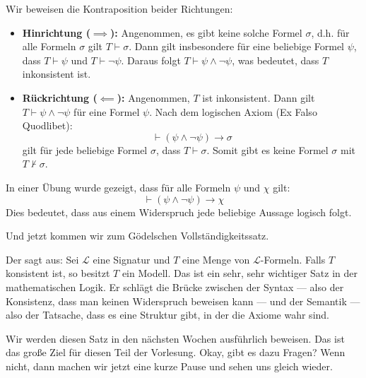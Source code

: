 \begin{math-stroke}

\begin{short-proof}
Wir beweisen die Kontraposition beider Richtungen:
\begin{itemize}
    \item \textbf{Hinrichtung ($\implies$):} Angenommen, es gibt keine solche Formel $\sigma$, d.h. für alle Formeln $\sigma$ gilt $T \vdash \sigma$. Dann gilt insbesondere für eine beliebige Formel $\psi$, dass $T \vdash \psi$ und $T \vdash \neg \psi$. Daraus folgt $T \vdash \psi \land \neg \psi$, was bedeutet, dass $T$ inkonsistent ist.
    \item \textbf{Rückrichtung ($\impliedby$):} Angenommen, $T$ ist inkonsistent. Dann gilt $T \vdash \psi \land \neg \psi$ für eine Formel $\psi$. Nach dem logischen Axiom (Ex Falso Quodlibet):
    \[ \vdash (\psi \land \neg \psi) \rightarrow \sigma \]
    gilt für jede beliebige Formel $\sigma$, dass $T \vdash \sigma$. Somit gibt es keine Formel $\sigma$ mit $T \not\vdash \sigma$.
\end{itemize}
\end{short-proof}

\begin{remark}
In einer Übung wurde gezeigt, dass für alle Formeln $\psi$ und $\chi$ gilt:
\[ \vdash (\psi \land \neg \psi) \rightarrow \chi \]
Dies bedeutet, dass aus einem Widerspruch jede beliebige Aussage logisch folgt.
\end{remark}
\end{math-stroke}

\begin{spoken-clean}[00:28:32 - 00:31:10]
Und jetzt kommen wir zum Gödelschen Vollständigkeitssatz.

Der sagt aus: Sei $\mathcal{L}$ eine Signatur und $T$ eine Menge von $\mathcal{L}$-Formeln. Falls $T$ konsistent ist, so besitzt $T$ ein Modell. Das ist ein sehr, sehr wichtiger Satz in der mathematischen Logik. Er schlägt die Brücke zwischen der Syntax --- also der Konsistenz, dass man keinen Widerspruch beweisen kann --- und der Semantik --- also der Tatsache, dass es eine Struktur gibt, in der die Axiome wahr sind.

Wir werden diesen Satz in den nächsten Wochen ausführlich beweisen. Das ist das große Ziel für diesen Teil der Vorlesung. Okay, gibt es dazu Fragen? Wenn nicht, dann machen wir jetzt eine kurze Pause und sehen uns gleich wieder.
\end{spoken-clean}


